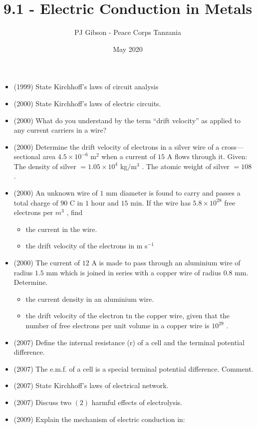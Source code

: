 \documentclass{article}
\title{\textbf{9.1 - Electric Conduction in Metals}}
\author{PJ Gibson - Peace Corps Tanzania}
\date{May 2020}
\begin{document}
\maketitle

\begin{itemize}
\item (1999)  State Kirchhoff’s laws of circuit analysis
\item (2000)  State Kirchhoff’s laws of electric circuits.
\item (2000)  What do you understand by the term “drift velocity” as applied to any current carriers in a wire?
\item (2000)  Determine the drift velocity of electrons in a silver wire of a cross—sectional area $ 4.5 \times 10^{-6}$ m$ ^{2}$ when a current of $ 15$ A flows through it. Given: The density of silver $ =1.05 \times 10^{4}$ kg$/$m$ ^{3}$ . The atomic weight of silver $ =108$ .
\item (2000)  An unknown wire of $ 1$ mm diameter is found to carry and passes a total charge of $ 90$ C in $ 1$ hour and $ 15$ min. If the wire has $ 5.8 \times 10^{28}$ free electrons per $ m^{3}$ , find
 \begin{itemize}
\item  the current in the wire.
\item the drift velocity of the electrons in m s$ ^{-1}$
\end{itemize}
\item (2000)  The current of $ 12$ A is made to pass through an aluminium wire of radius $ 1.5$ mm which is joined in series with a copper wire of radius $ 0.8$ mm. Determine.
 \begin{itemize}
\item the current density in an aluminium wire.
\item the drift velocity of the electron tn the copper wire, given that the number of free electrons per unit volume in a copper wire is $ 10^{29}$ .
\end{itemize}
\item (2007)  Define the internal resistance (r) of a cell and the terminal potential difference.
\item (2007)  The e.m.f. of a cell is a special terminal potential difference.  Comment.
\item (2007)  State Kirchhoff's laws of electrical network.
\item (2007)  Discuss two $ (2)$ harmful effects of electrolysis. 
\item (2009)  Explain the mechanism of electric conduction in:

\end{itemize}
\end{document}
